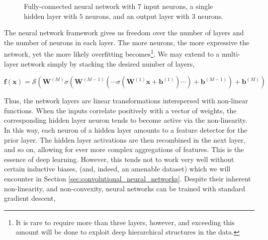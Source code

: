 \begin{figure}

\caption{Fully-connected neural network with $7$ input neurons, a single hidden layer with $5$ neurons, and an output layer with $3$ neurons.}
\label{fig:neural_network}
\end{figure}

The neural network framework gives us freedom over the number of layers and the number of neurons in each layer. The more neurons, the more expressive the network, yet the more likely overfitting becomes\footnote{It is rare to require more than three layers, however, and exceeding this amount will be done to exploit deep hierarchical structures in the data.}. We may extend to a multi-layer network simply by stacking the desired number of layers,

\begin{equation}
\mathbf{f}(\mathbf{x}) = \mathcal{S}(\mathbf{W}^{(M)}\sigma(\mathbf{W}^{(M-1)}(\cdots\sigma(\mathbf{W}^{(1)}\mathbf{x} + \mathbf{b}^{(1)})\cdots) + \mathbf{b}^{(M-1)})  + \mathbf{b}^{(M)})
\end{equation}

Thus, the network layers are linear transformations interspersed with non-linear functions. When the inputs correlate positively with a vector of weights, the corresponding hidden layer neuron tends to become active via the non-linearity. In this way, each neuron of a hidden layer amounts to a feature detector for the prior layer. The hidden layer activations are then recombined in the next layer, and so on, allowing for ever more complex aggregations of features. This is the essence of deep learning. However, this tends not to work very well without certain inductive biases, (and, indeed, an amenable dataset) which we will encounter in Section \ref{sec:convolutional_neural_networks}. Despite their inherent non-linearity, and non-convexity, neural networks can be trained with standard gradient descent,


